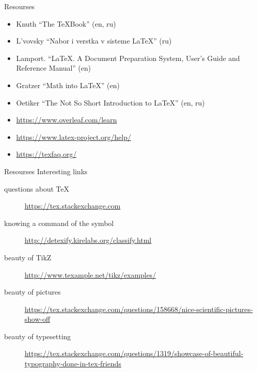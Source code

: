 \begin{frame}{Resourses\magicPage}%

\vspace{-3.0ex}
\begin{itemize}
    \item Knuth ``The \TeX Book'' (en, ru)
    \item L'vovsky ``Nabor i verstka v sisteme \LaTeX'' (ru)
    \item Lamport. ``\LaTeX. A Document Preparation System, User’s Guide and Reference Manual'' (en)
    \item Gratzer ``Math into \LaTeX'' (en) 
    \item Oetiker ``The Not So Short Introduction to \LaTeX'' (en, ru)
    \item \url{https://www.overleaf.com/learn}
    \item \url{https://www.latex-project.org/help/}
    \item \url{https://texfaq.org/}
\end{itemize}
\end{frame}


\begin{frame}[fragile]{Resourses \magicPage}{Interesting links}
\cprotect{}
\small
\begin{description}
    \item[questions about \TeX] \url{https://tex.stackexchange.com} \vspace{-1ex}
    \item[knowing a command of the symbol] \url{http://detexify.kirelabs.org/classify.html} \vspace{-1ex}
    \item[beauty of TikZ] \url{http://www.texample.net/tikz/examples/} \vspace{-1ex}
    \item[beauty of pictures] \url{https://tex.stackexchange.com/questions/158668/nice-scientific-pictures-show-off}\vspace{-1ex}
    \item[beauty of typesetting] \url{https://tex.stackexchange.com/questions/1319/showcase-of-beautiful-typography-done-in-tex-friends}\vspace{-1ex}
\end{description}
\end{frame}

